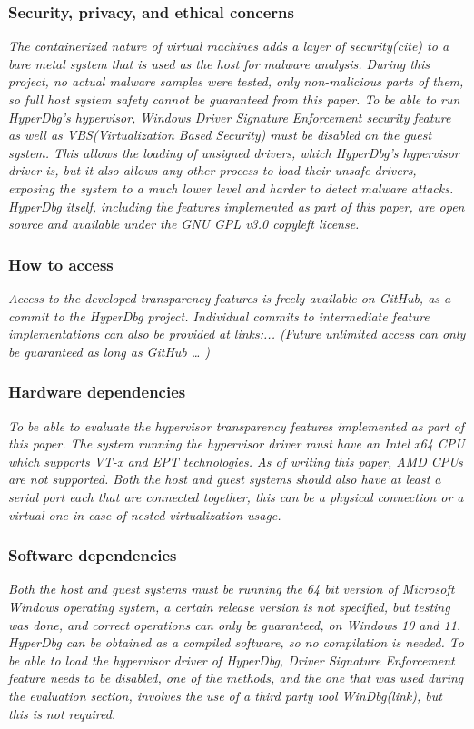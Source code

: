 \subsubsection{Security, privacy, and ethical concerns}
\textit{The containerized nature of virtual machines adds a layer of security(cite) to a bare metal system that is used as the host for malware analysis.
During this project, no actual malware samples were tested, only non-malicious parts of them, so full host system safety cannot be guaranteed from this paper.
To be able to run HyperDbg’s hypervisor, Windows Driver Signature Enforcement security feature as well as VBS(Virtualization Based Security) must be disabled on the guest system.
This allows the loading of unsigned drivers, which HyperDbg’s hypervisor driver is, but it also allows any other process to load their unsafe drivers, 
exposing the system to a much lower level and harder to detect malware attacks. HyperDbg itself, including the features implemented as part of this paper, are open source and available under the GNU GPL v3.0 copyleft license.}

\subsubsection{How to access}
\textit{Access to the developed transparency features is freely available on GitHub, as a commit to the HyperDbg project. 
Individual commits to intermediate feature implementations can also be provided at links:...  
(Future unlimited access can only be guaranteed as long as GitHub … )}


\subsubsection{Hardware dependencies}
\textit{To be able to evaluate the hypervisor transparency features implemented as part of this paper.
The system running the hypervisor driver must have an Intel x64 CPU which supports VT-x and EPT technologies. As of writing this paper, AMD CPUs are not supported.
Both the host and guest systems should also have at least a serial port each that are connected together, this can be a physical connection or a virtual one in case of nested virtualization usage.}

\subsubsection{Software dependencies}
\textit{Both the host and guest systems must be running the 64 bit version of Microsoft Windows operating system,
a certain release version is not specified, but testing was done, and correct operations can only be guaranteed, on Windows 10 and 11.
HyperDbg can be obtained as a compiled software, so no compilation is needed. To be able to load the hypervisor driver of HyperDbg,
Driver Signature Enforcement feature needs to be disabled, one of the methods, and the one that was used during the evaluation section, involves the use of a third party tool WinDbg(link), but this is not required.}

